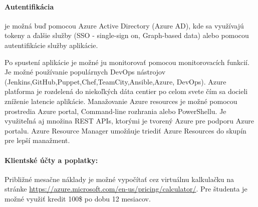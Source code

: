 \paragraph{Autentifikácia} je možná buď pomocou Azure Active Directory (Azure AD), kde sa využívajú tokeny a ďalšie služby (SSO - single-sign on, Graph-based data) alebo pomocou autentifikácie služby aplikácie.%

Po spustení aplikácie je možné ju monitorovať pomocou monitorovacích funkcií. Je možné používanie populárnych DevOps nástrojov (Jenkins,GitHub,Puppet,Chef,TeamCity,Ansible,Azure, DevOps). Azure platforma je rozdelená do niekoľkých dáta centier po celom svete čím sa docieli zníženie latencie aplikácie. Manažovanie Azure resources je možné pomocou prostredia Azure portal, Command-line rozhrania alebo PowerShellu. Je využiteľná aj množina REST APIs, ktorými je tvorený Azure pre podporu Azure portalu.
Azure Resource Manager umožňuje triediť Azure Resources do skupín pre lepší manažment.\cite{azure}
\paragraph{Klientské účty a poplatky: }
Približné mesačne náklady je možné vypočítať cez virtuálnu kalkulačku na stránke \url{https://azure.microsoft.com/en-us/pricing/calculator/}. Pre študenta je možné využiť kredit 100\$ po dobu 12 mesiacov.\cite{azure_student}



